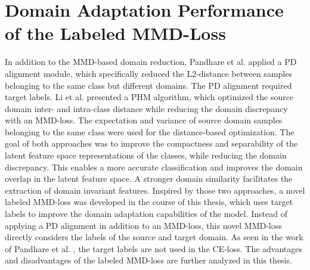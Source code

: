 \section{Domain Adaptation Performance of the Labeled MMD-Loss}
In addition to the MMD-based domain reduction, Pandhare et al. \cite{Pandhare2021} applied a PD alignment module, which specifically reduced the L2-distance between samples belonging to the same class but different domains. The PD alignment required target labels. Li et al. \cite{Li2018} presented a PHM algorithm, which optimized the source domain inter- and intra-class distance while reducing the domain discrepancy with an MMD-loss. The expectation and variance of source domain samples belonging to the same class were used for the distance-based optimization. The goal of both approaches was to improve the compactness and separability of the latent feature space representations of the classes, while reducing the domain discrepancy. This enables a more accurate classification and improves the domain overlap in the latent feature space. A stronger domain similarity facilitates the extraction of domain invariant features. Inspired by those two approaches, a novel labeled MMD-loss was developed in the course of this thesis, which uses target labels to improve the domain adaptation capabilities of the model. Instead of applying a PD alignment in addition to an MMD-loss, this novel MMD-loss directly considers the labels of the source and target domain. As seen in the work of Pandhare et al. \cite{Pandhare2021}, the target labels are not used in the CE-loss. The advantages and disadvantages of the labeled MMD-loss are further analyzed in this thesis.

